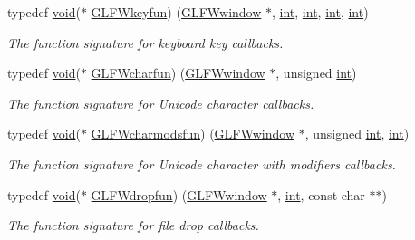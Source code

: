 \begin{DoxyCompactItemize}
typedef \hyperlink{wglew_8h_aeea6e3dfae3acf232096f57d2d57f084}{void}($\ast$ \hyperlink{group__input_ga0192a232a41e4e82948217c8ba94fdfd}{G\+L\+F\+Wkeyfun}) (\hyperlink{group__window_ga3c96d80d363e67d13a41b5d1821f3242}{G\+L\+F\+Wwindow} $\ast$, \hyperlink{wglew_8h_a500a82aecba06f4550f6849b8099ca21}{int}, \hyperlink{wglew_8h_a500a82aecba06f4550f6849b8099ca21}{int}, \hyperlink{wglew_8h_a500a82aecba06f4550f6849b8099ca21}{int}, \hyperlink{wglew_8h_a500a82aecba06f4550f6849b8099ca21}{int})
\begin{DoxyCompactList}\small\item\em The function signature for keyboard key callbacks. \end{DoxyCompactList}\item 
typedef \hyperlink{wglew_8h_aeea6e3dfae3acf232096f57d2d57f084}{void}($\ast$ \hyperlink{group__input_gabf24451c7ceb1952bc02b17a0d5c3e5f}{G\+L\+F\+Wcharfun}) (\hyperlink{group__window_ga3c96d80d363e67d13a41b5d1821f3242}{G\+L\+F\+Wwindow} $\ast$, unsigned \hyperlink{wglew_8h_a500a82aecba06f4550f6849b8099ca21}{int})
\begin{DoxyCompactList}\small\item\em The function signature for Unicode character callbacks. \end{DoxyCompactList}\item 
typedef \hyperlink{wglew_8h_aeea6e3dfae3acf232096f57d2d57f084}{void}($\ast$ \hyperlink{group__input_gae36fb6897d2b7df9b128900c8ce9c507}{G\+L\+F\+Wcharmodsfun}) (\hyperlink{group__window_ga3c96d80d363e67d13a41b5d1821f3242}{G\+L\+F\+Wwindow} $\ast$, unsigned \hyperlink{wglew_8h_a500a82aecba06f4550f6849b8099ca21}{int}, \hyperlink{wglew_8h_a500a82aecba06f4550f6849b8099ca21}{int})
\begin{DoxyCompactList}\small\item\em The function signature for Unicode character with modifiers callbacks. \end{DoxyCompactList}\item 
typedef \hyperlink{wglew_8h_aeea6e3dfae3acf232096f57d2d57f084}{void}($\ast$ \hyperlink{group__input_gab71f4ca80b651462852e601caf308c4a}{G\+L\+F\+Wdropfun}) (\hyperlink{group__window_ga3c96d80d363e67d13a41b5d1821f3242}{G\+L\+F\+Wwindow} $\ast$, \hyperlink{wglew_8h_a500a82aecba06f4550f6849b8099ca21}{int}, const char $\ast$$\ast$)
\begin{DoxyCompactList}\small\item\em The function signature for file drop callbacks. \end{DoxyCompactList}\end{DoxyCompactItemize}

